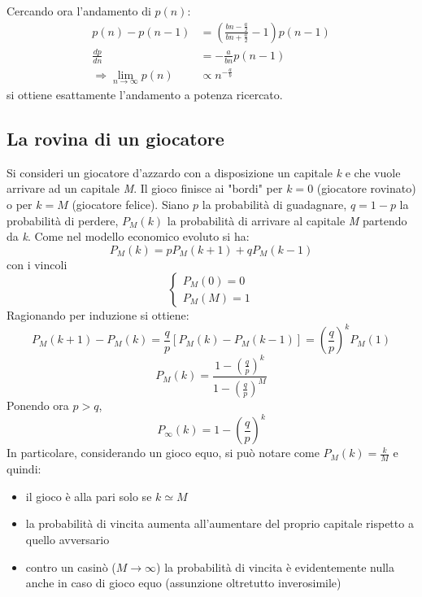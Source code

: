 \documentclass[12pt, a4paper]{book}
\theoremstyle{theorem}
\begin{document}
				Cercando ora l'andamento di $p(n)$:
				\begin{equation}
					\begin{split}
						p(n)-p(n-1)&=\left(\frac{bn-\frac{a}{2}}{bn+\frac{a}{2}}-1\right)p(n-1)\\
						\frac{dp}{dn}&=-\frac{a}{bn}p(n-1)\\
						\Rightarrow\lim_{n\to\infty}p(n)&\propto n^{-\frac{a}{b}}
					\end{split}
				\end{equation}
				si ottiene esattamente l'andamento a potenza ricercato.
			\subsection{La rovina di un giocatore}
				Si consideri un giocatore d'azzardo con a disposizione un capitale \textit{k} e che vuole arrivare ad un capitale \textit{M}.
				Il gioco finisce ai "bordi" per $k=0$ (giocatore rovinato) o per $k=M$ (giocatore felice).
				Siano $p$ la probabilità di guadagnare, $q=1-p$ la probabilità di perdere, $P_M(k)$ la probabilità di arrivare al capitale \textit{M} partendo da \textit{k}.
				Come nel modello economico evoluto si ha:
				\begin{equation}
					P_M(k)=pP_M(k+1)+qP_M(k-1)
				\end{equation}
				con i vincoli
				\begin{equation}
					\begin{cases}
						P_M(0)=0\\
						P_M(M)=1
					\end{cases}
				\end{equation}
				Ragionando per induzione si ottiene:
				\begin{equation}
					P_M(k+1)-P_M(k)=\frac{q}{p}\left[P_M(k)-P_M(k-1)\right]=\left(\frac{q}{p}\right)^kP_M(1)
				\end{equation}
				\begin{equation}
					P_M(k)=\frac{1-\left(\frac{q}{p}\right)^k}{1-\left(\frac{q}{p}\right)^M}
				\end{equation}
				Ponendo ora $p>q$,
				\begin{equation}
					P_\infty(k)=1-\left(\frac{q}{p}\right)^k
				\end{equation}
				In particolare, considerando un gioco equo, si può notare come $P_M(k)=\frac{k}{M}$ e quindi:
				\begin{itemize}
					\item il gioco è alla pari solo se $k\simeq M$
					\item la probabilità di vincita aumenta all'aumentare del proprio capitale rispetto a quello avversario
					\item contro un casinò ($M\to\infty$) la probabilità di vincita è evidentemente nulla anche in caso di gioco equo (assunzione oltretutto inverosimile)
				\end{itemize}
	
\end{document}
